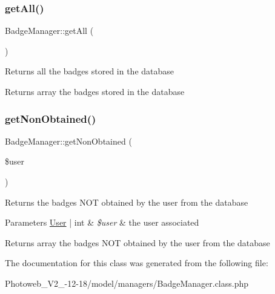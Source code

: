 \subsubsection{\texorpdfstring{get\+All()}{getAll()}}
{\footnotesize\ttfamily Badge\+Manager\+::get\+All (\begin{DoxyParamCaption}{ }\end{DoxyParamCaption})}

Returns all the badges stored in the database \begin{DoxyReturn}{Returns}
array the badges stored in the database 
\end{DoxyReturn}
\mbox{\label{classBadgeManager_a145a37b6d0d04785a9f6d01bd013188a}} 
\subsubsection{\texorpdfstring{get\+Non\+Obtained()}{getNonObtained()}}
{\footnotesize\ttfamily Badge\+Manager\+::get\+Non\+Obtained (\begin{DoxyParamCaption}\item[{}]{\$user }\end{DoxyParamCaption})}

Returns the badges N\+OT obtained by the user from the database 
\begin{DoxyParams}[1]{Parameters}
\hyperlink{classUser}{User} | int & {\em \$user} & the user associated \\
\hline
\end{DoxyParams}
\begin{DoxyReturn}{Returns}
array the badges N\+OT obtained by the user from the database 
\end{DoxyReturn}


The documentation for this class was generated from the following file\+:\begin{DoxyCompactItemize}
\item 
Photoweb\+\_\+\+V2\+\_-\/12-\/18/model/managers/Badge\+Manager.\+class.\+php\end{DoxyCompactItemize}
